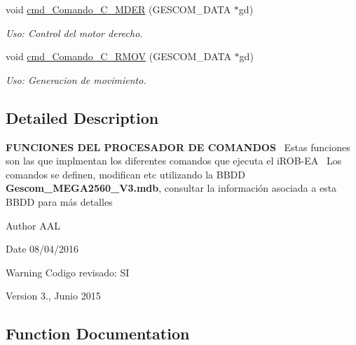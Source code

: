 \begin{DoxyCompactItemize}
void \hyperlink{_gescom___m_e_g_a2560___v3___interfaz_8ino_a24e35e85f799a97fbf24ffa7fb32bea7}{cmd\+\_\+\+Comando\+\_\+\+C\+\_\+\+M\+D\+ER} (G\+E\+S\+C\+O\+M\+\_\+\+D\+A\+TA $\ast$gd)
\begin{DoxyCompactList}\small\item\em Uso\+: Control del motor derecho. \end{DoxyCompactList}\item 
void \hyperlink{_gescom___m_e_g_a2560___v3___interfaz_8ino_a7e318e5158915a5ff22b546547ccdc61}{cmd\+\_\+\+Comando\+\_\+\+C\+\_\+\+R\+M\+OV} (G\+E\+S\+C\+O\+M\+\_\+\+D\+A\+TA $\ast$gd)
\begin{DoxyCompactList}\small\item\em Uso\+: Generacion de movimiento. \end{DoxyCompactList}\end{DoxyCompactItemize}


\subsection{Detailed Description}
{\bfseries F\+U\+N\+C\+I\+O\+N\+ES D\+EL P\+R\+O\+C\+E\+S\+A\+D\+OR DE C\+O\+M\+A\+N\+D\+OS}~\newline
 Estas funciones son las que implmentan los diferentes comandos que ejecuta el i\+R\+O\+B-\/\+EA~\newline
 Los comandos se definen, modifican etc utilizando la B\+B\+DD {\bfseries Gescom\+\_\+\+M\+E\+G\+A2560\+\_\+\+V3.\+mdb}, consultar la información asociada a esta B\+B\+DD para más detalles~\newline






\begin{DoxyAuthor}{Author}
A\+AL
\end{DoxyAuthor}
\begin{DoxyDate}{Date}
08/04/2016 
\end{DoxyDate}
\begin{DoxyWarning}{Warning}
Codigo revisado\+: SI 
\end{DoxyWarning}
\begin{DoxyVersion}{Version}
3., Junio 2015 


\end{DoxyVersion}


\subsection{Function Documentation}
